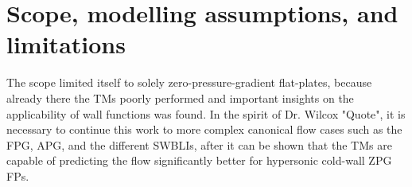 \section{Scope, modelling assumptions, and limitations}
\label{sec:introduction:scope-assumptions-limitations}



The scope limited itself to solely zero-pressure-gradient flat-plates, because already there the TMs poorly performed and important insights on the applicability of wall functions was found. In the spirit of Dr. Wilcox "Quote", it is necessary to continue this work to more complex canonical flow cases such as the FPG, APG, and the different SWBLIs, after it can be shown that the TMs are capable of predicting the flow significantly better for hypersonic cold-wall ZPG FPs.
